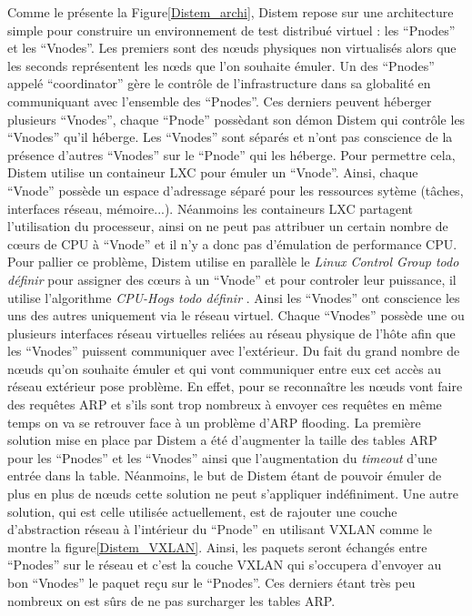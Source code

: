 Comme le présente la Figure\ref{Distem_archi}, Distem repose sur une architecture simple pour construire un environnement de test distribué virtuel : les ``Pnodes'' et les ``Vnodes''. Les premiers sont des n\oe uds physiques non virtualisés alors que les seconds représentent les n\oe ds que l'on souhaite émuler. Un des ``Pnodes'' appelé ``coordinator'' gère le contrôle de l'infrastructure dans sa globalité en communiquant avec l'ensemble des ``Pnodes''. Ces derniers peuvent héberger plusieurs ``Vnodes'', chaque ``Pnode'' possèdant son démon Distem qui contrôle les ``Vnodes'' qu'il héberge. Les ``Vnodes'' sont séparés et n'ont pas conscience de la présence d'autres ``Vnodes'' sur le ``Pnode'' qui les héberge. Pour permettre cela, Distem utilise un containeur LXC pour émuler un ``Vnode''. Ainsi, chaque ``Vnode'' possède un espace d'adressage séparé pour les ressources sytème (tâches, interfaces réseau, mémoire...). Néanmoins les containeurs LXC partagent l'utilisation du processeur, ainsi on ne peut pas attribuer un certain nombre de c\oe urs de CPU à ``Vnode'' et il n'y a donc pas d'émulation de performance CPU. Pour pallier ce problème, Distem utilise en parallèle le \textit{Linux Control Group{\color{red} todo définir}} pour assigner des c\oe urs à un ``Vnode'' et pour controler leur puissance, il utilise l'algorithme \textit{CPU-Hogs{\color{red} todo définir}} \citep{DISTEMbuchert2011methods}. Ainsi les ``Vnodes'' ont conscience les uns des autres uniquement via le réseau virtuel. Chaque ``Vnodes'' possède une ou plusieurs interfaces réseau virtuelles reliées au réseau physique de l'hôte afin que les ``Vnodes'' puissent communiquer avec l'extérieur. Du fait du grand nombre de n\oe uds qu'on souhaite émuler et qui vont communiquer entre eux cet accès au réseau extérieur pose problème. En effet, pour se reconnaître les n\oe uds vont faire des requêtes ARP et s'ils sont trop nombreux à envoyer ces requêtes en même temps on va se retrouver face à un problème d'ARP flooding. La première solution mise en place par Distem a été d'augmenter la taille des tables ARP pour les ``Pnodes'' et les ``Vnodes'' ainsi que l'augmentation du \textit{timeout} d'une entrée dans la table. Néanmoins, le but de Distem étant de pouvoir émuler de plus en plus de n\oe uds cette solution ne peut s'appliquer indéfiniment. Une autre solution, qui est celle utilisée actuellement, est de rajouter une couche d'abstraction réseau à l'intérieur du ``Pnode'' en utilisant VXLAN\citep{DISTEMbuchert2014emulation} comme le montre la figure\ref{Distem_VXLAN}. Ainsi, les paquets seront échangés entre ``Pnodes'' sur le réseau et c'est la couche VXLAN qui s'occupera d'envoyer au bon ``Vnodes'' le paquet reçu sur le ``Pnodes''. Ces derniers étant très peu nombreux on est sûrs de ne pas surcharger les tables ARP.

